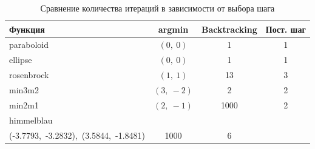 \documentclass{article}
\begin{document}
\begin{table}[H]
\centering
\begin{tabular}{|l|c|c|c|}
\hline
\textbf{Функция} & \textbf{argmin} & \textbf{Backtracking} & \textbf{Пост. шаг} \\
\hline
paraboloid & \( (0,\ 0) \) & 1 & 1 \\
\hline
ellipse & \( (0,\ 0) \) & 1 & 1 \\
\hline
rosenbrock & \( (1,\ 1) \) & 13 & 3 \\
\hline
min3m2 & \( (3,\ -2) \) & 2 & 2 \\
\hline
min2m1 & \( (2,\ -1) \) & 1000 & 2 \\
\hline
himmelblau & 
\(
\begin{array}{l}
(3.0,\ 2.0),\ (-2.8051,\ 3.1313), \\
(-3.7793,\ -3.2832),\ (3.5844,\ -1.8481)
\end{array}
\) 
& 1000 & 6 \\
\hline
\end{tabular}
\caption{Сравнение количества итераций в зависимости от выбора шага}
\end{table}
\end{document}
